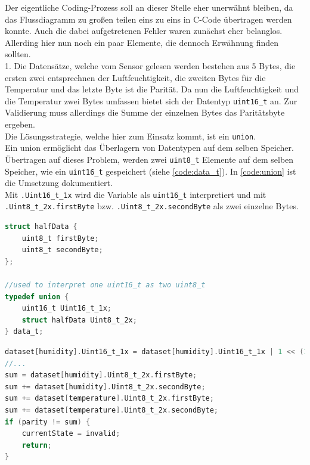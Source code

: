 \documentclass[11pt,a4paper,titlepage]{article}
\begin{document}
Der eigentliche Coding-Prozess soll an dieser Stelle eher unerwähnt bleiben,
da das Flussdiagramm zu großen teilen eins zu eins in C-Code übertragen werden konnte.
Auch die dabei aufgetretenen Fehler waren zunächst eher belanglos.\\

Allerding hier nun noch ein paar Elemente, die dennoch Erwähnung finden sollten.\\

1. Die Datensätze, welche vom Sensor gelesen werden bestehen aus 5 Bytes,
die ersten zwei entsprechnen der Luftfeuchtigkeit, die zweiten Bytes für die Temperatur und das letzte Byte ist die Parität.
Da nun die Luftfeuchtigkeit und die Temperatur zwei Bytes umfassen bietet sich der Datentyp \texttt{uint16\_t} an.
Zur Validierung muss allerdings die Summe der einzelnen Bytes das Paritätsbyte ergeben.\\
Die Lösungsstrategie, welche hier zum Einsatz kommt, ist ein \texttt{union}.\\
Ein union ermöglicht das Überlagern von Datentypen auf dem selben Speicher.
Übertragen auf dieses Problem, werden zwei \texttt{uint8\_t} Elemente auf dem selben Speicher,
wie ein \texttt{uint16\_t} gespeichert (siehe \cref{code:data_t}).
In \cref{code:union} ist die Umsetzung dokumentiert.\\
Mit \verb|.Uint16_t_1x| wird die Variable als \texttt{uint16\_t} interpretiert und
mit \verb|.Uint8_t_2x.firstByte| bzw. \verb|.Uint8_t_2x.secondByte| als zwei einzelne Bytes.

\begin{lstlisting}[language=C, label={code:data_t}, caption={Der \texttt{data\_t} Datentyp}]
struct halfData {
    uint8_t firstByte;
    uint8_t secondByte;
};

//used to interpret one uint16_t as two uint8_t
typedef union {
    uint16_t Uint16_t_1x;
    struct halfData Uint8_t_2x;
} data_t;
\end{lstlisting}

\begin{lstlisting}[language=C, label={code:union}, caption={Nutzung des \texttt{data\_t} Datentyps}]
dataset[humidity].Uint16_t_1x = dataset[humidity].Uint16_t_1x | 1 << (17 - element);
//...
sum = dataset[humidity].Uint8_t_2x.firstByte;
sum += dataset[humidity].Uint8_t_2x.secondByte;
sum += dataset[temperature].Uint8_t_2x.firstByte;
sum += dataset[temperature].Uint8_t_2x.secondByte;
if (parity != sum) {
    currentState = invalid;
    return;
}
\end{lstlisting}
\end{document}
